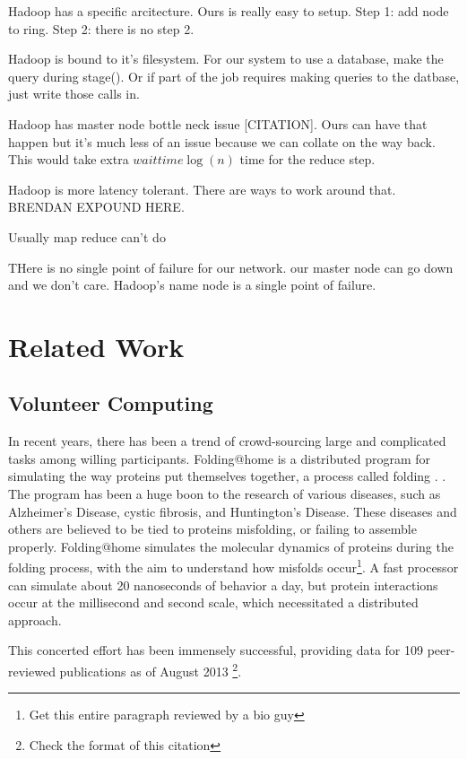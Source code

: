 \documentclass[conference, compsocconf, letterpaper]{IEEEtran}
\begin{document}
Hadoop has a specific arcitecture.  Ours is really easy to setup.  Step 1: add node to ring. Step 2: there is no step 2.

Hadoop is bound to it's filesystem. For our system to use a database, make the query during stage().  Or if part of the job requires making queries to the datbase, just write those calls in.

Hadoop has master node bottle neck issue [CITATION].  Ours can have that happen but it's much less of an issue because we can collate on the way back.   This would take extra  $waittime \log(n)$ time for the reduce step. 

Hadoop is more latency tolerant.  There are ways to work around that.  BRENDAN EXPOUND HERE.

Usually map reduce can't do 

THere is no single point of failure for our network.  our master node can go down and we don't care. Hadoop's name node is a single point of failure.

\section{Related Work}

\subsection{Volunteer Computing}
In recent years, there has been a trend of crowd-sourcing large and complicated tasks among willing participants.  Folding@home is a distributed program for simulating the way proteins put themselves together, a process called folding \cite{folding}.  \cite{folding}.  The program has been a huge boon to the research of various diseases, such as Alzheimer's Disease, cystic fibrosis, and Huntington's Disease.  These diseases and others are believed to be tied to proteins misfolding, or failing to assemble properly.  Folding@home simulates the molecular dynamics of proteins during the folding process, with the aim to understand  how misfolds occur\footnote{Get this entire paragraph reviewed by a bio guy}.  A fast processor can simulate about 20 nanoseconds of behavior a day, but protein interactions occur at the millisecond and second scale, which necessitated a distributed approach.  

This concerted effort has been immensely successful, providing data for 109 peer-reviewed publications as of August 2013 \cite{foldingPapers}\footnote{Check the format of this citation}.
\end{document}
